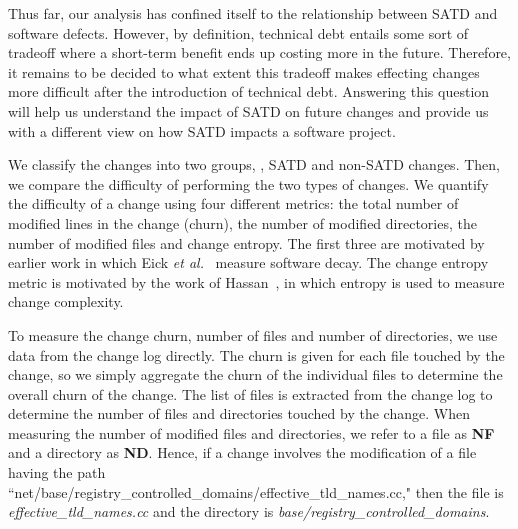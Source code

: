  Thus far, our analysis has confined itself to the relationship between SATD and software defects. However, by definition, technical debt entails some sort of tradeoff where a short-term benefit ends up costing more in the future. Therefore, it remains to be decided to what extent this tradeoff makes effecting changes more difficult after the introduction of technical debt. Answering this question will help us understand the impact of SATD on future changes and provide us with a different view on how SATD impacts a software project.


  We classify the changes into two groups, \ie{}, SATD and non-SATD changes. Then, we compare the difficulty of performing the two types of changes. We quantify the difficulty of a change using four different metrics: the total number of modified lines in the change (churn), the number of modified directories, the number of modified files and change entropy. The first three are motivated by earlier work in which Eick \emph{et al.}~\cite{eick2001decay} measure software decay. The change entropy metric is motivated by the work of Hassan~\cite{hassan2009predicting}, in which entropy is used to measure change complexity.



To measure the change churn, number of files and number of directories, we use data from the change log directly. The churn is given for each file touched by the change, so we simply aggregate the churn of the individual files to determine the overall churn of the change. The list of files is extracted from the change log to determine the number of files and directories touched by the change. When measuring the number of modified  files and directories, we refer to a file as \textbf{NF} and  a directory as \textbf{ND}. Hence, if a change involves the modification of a file having the path ``net/base/registry\_controlled\_domains/effective\_tld\_names.cc," then the file is \textit{effective\_tld\_names.cc} and the directory is \textit{base/registry\_controlled\_domains}.



